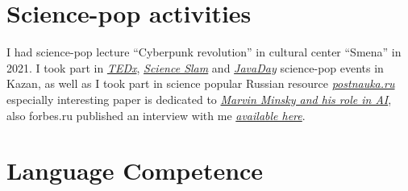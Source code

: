 \documentclass{moderncv}
\begin{document}




    \section{Science-pop activities}
    
    I had science-pop lecture ``Cyberpunk revolution'' in cultural center ``Smena'' in 2021.
    I took part in \href{https://www.youtube.com/watch?v=BLvS7h3kRbo}{\emph{TEDx}}, \href{https://vk.com/video-87488544_171504962}{\emph{Science Slam}} and \href{https://www.youtube.com/watch?v=sLLKxvUEA7E}{\emph{JavaDay}} science-pop events in Kazan, as well as I took part in science popular Russian resource \href{https://postnauka.ru/author/talanov}{\emph{postnauka.ru}} especially interesting paper is dedicated to \href{https://postnauka.ru/faq/58727}{\emph{Marvin Minsky and his role in AI}}, also forbes.ru published an interview with me \href{http://www.forbes.ru/mneniya-column/288097-kak-sozdat-emotsionalnyi-iskusstvennyi-intellekt}{\emph{available here}}.

    \section{Language Competence}


\end{document}
